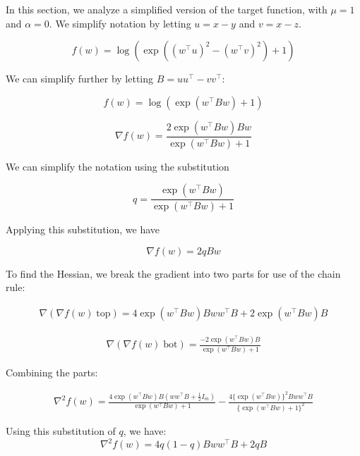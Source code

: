 \documentclass[11pt]{article}
\begin{document}
In this section, we analyze a simplified version of the target function, with $\mu = 1$ and $\alpha = 0$. We simplify notation by letting $u = x - y$ and $v = x - z$.

\begin{equation}
    f(w) = \log(\exp((w^{\top}u)^2 - (w^{\top}v)^2) + 1)
\end{equation}

We can simplify further by letting $B = uu^\top - vv^\top$:

\begin{equation}
\label{eq:f}
    f(w) = \log(\exp(w^{\top}Bw) + 1)
\end{equation}

\begin{equation}
    \nabla f(w) = \frac{2 \exp(w^{\top}Bw)Bw}{\exp(w^{\top}Bw) + 1}
\end{equation}

We can simplify the notation using the substitution

\begin{equation}
q = \frac{\exp(w^{\top}Bw)}{\exp(w^{\top}Bw) + 1}
\end{equation}

Applying this substitution, we have

\begin{equation}
\label{eq:grad_f}
    \nabla f(w) = 2qBw
\end{equation}

To find the Hessian, we break the gradient into two parts for use of the chain rule:

\begin{align*}
    \nabla (\nabla f(w) \; \textrm{top}) = 4 \exp(w^{\top}Bw)Bww^{\top}B  + 2 \exp(w^{\top}Bw)B
\end{align*}

\begin{align*}
    \nabla (\nabla f(w) \; \textrm{bot}) = \frac{-2 \exp(w^{\top}Bw)B}{\exp(w^{\top}Bw) + 1}
\end{align*}

Combining the parts:

\begin{align*}
    \nabla^2 f(w) = \frac{4 \exp(w^{\top}Bw)B(ww^{\top}B + \frac{1}{2}I_m)}{\exp(w^{\top}Bw) + 1} - \frac{4 \{\exp(w^{\top}Bw)\}^2 Bww^{\top}B }{\{\exp(w^{\top}Bw) + 1\}^2}
\end{align*}

Using this substitution of $q$,  we have:
\begin{equation}
    \nabla^2 f(w) = 4q(1-q)Bww^{\top}B + 2qB
\end{equation}
\end{document}
